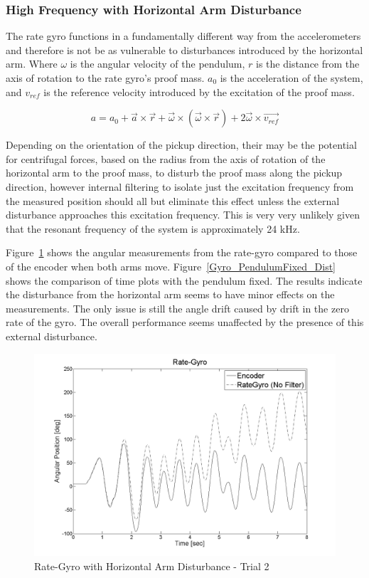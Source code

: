 \documentclass{article}
\theoremstyle{plain}
\theoremstyle{definition}
\theoremstyle{remark}
\begin{document}
\subsubsection{High Frequency with Horizontal Arm Disturbance}

The rate gyro functions in a fundamentally different way from the accelerometers and therefore is not be as vulnerable to disturbances introduced by the horizontal arm.  Where $\omega$ is the angular velocity of the pendulum, $r$ is the distance from the axis of rotation to the rate gyro's proof mass.  $a_0$ is the acceleration of the system, and $v_{ref}$ is the reference velocity introduced by the excitation of the proof mass.

$$ a = a_0 + \vec{a} \times \vec{r} + \vec{\omega} \times \left(  \vec{\omega} \times \vec{r} \right) + 2 \vec{\omega} \times \vec{v_{ref}} $$

Depending on the orientation of the pickup direction, their may be the potential for centrifugal forces, based on the radius from the axis of rotation of the horizontal arm to the proof mass, to disturb the proof mass along the pickup direction, however internal filtering to isolate just the excitation frequency from the measured position should all but eliminate this effect unless the external disturbance approaches this excitation frequency.  This is very very unlikely given that the resonant frequency of the system is approximately 24 kHz.  

Figure~\ref{Gyro_Dist2} shows the angular measurements from the rate-gyro compared to those of the encoder when both arms move. Figure~\ref{Gyro_PendulumFixed_Dist} shows the comparison of time plots with the pendulum fixed. The results indicate the disturbance from the horizontal arm seems to have minor effects on the measurements. The only issue is still the angle drift caused by drift in the zero rate of the gyro. The overall performance seems unaffected by the presence of this external disturbance.

\begin{figure}[hbt]
\begin{center}
\includegraphics[width = 13cm]{Gyro_Dist2.png}
\caption{Rate-Gyro with Horizontal Arm Disturbance - Trial 2}
\label{Gyro_Dist2}
\end{center}
\end{figure}
\end{document}
